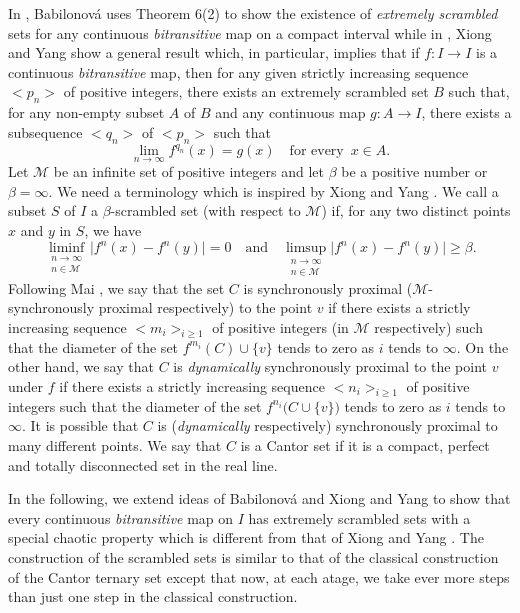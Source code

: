 \documentclass[12pt]{article}
\begin{document}
In {\bf\cite{bab}}, Babilonov\'a uses Theorem 6(2) to show the existence of {\it extremely scrambled} sets for any continuous {\it bitransitive} map on a compact interval while in {\bf\cite{xiong}}, Xiong and Yang show a general result which, in particular, implies that if $f : I \longrightarrow I$ is a continuous {\it bitransitive} map, then for any given strictly increasing sequence $< p_n >$ of positive integers, there exists an extremely scrambled set $B$ such that, for any non-empty subset $A$ of $B$ and any continuous map $g : A \longrightarrow I$, there exists a subsequence $< q_n >$ of $< p_n >$ such that 
$$
\lim_{n \to \infty} f^{q_n}(x) = g(x) \quad \text{for every} \,\,\, x \in A.
$$
\indent Let $\mathcal M$ be an infinite set of positive integers and let $\beta$ be a positive number or $\beta = \infty$.  We need a terminology which is inspired by Xiong and Yang {\bf\cite{xiong}}.  We call a subset $S$ of $I$ a $\beta$-scrambled set (with respect to $\mathcal M$) if, for any two distinct points $x$ and $y$ in $S$, we have
$$
\liminf_{\substack{{n \to \infty} \\ n \in \mathcal M}} \big|f^n(x) - f^n(y)\big| = 0 \quad \text{and} \quad \limsup_{\substack{{n \to \infty} \\ n \in \mathcal M}} \big|f^n(x) - f^n(y)\big| \ge \beta.
$$
\indent Following Mai {\bf\cite{mai}}, we say that the set $C$ is synchronously proximal ($\mathcal M$-synchronously proximal respectively) to the point $v$ if there exists a strictly increasing sequence $< m_i >_{i \ge 1}$ of positive integers (in $\mathcal M$ respectively) such that the diameter of the set $f^{m_i}(C) \cup \{ v \}$ tends to zero as $i$ tends to $\infty$.  On the other hand, we say that $C$ is {\it dynamically} synchronously proximal to the point $v$ under $f$ if there exists a strictly increasing sequence $< n_i >_{i \ge 1}$ of positive integers such that the diameter of the set $f^{n_i}\big(C \cup \{ v \}\big)$ tends to zero as $i$ tends to $\infty$.  It is possible that $C$ is ({\it dynamically} respectively) synchronously proximal to many different points.  We say that $C$ is a Cantor set if it is a compact, perfect and totally disconnected set in the real line.

In the following, we extend ideas of Babilonov\'a {\bf\cite{bab}} and Xiong and Yang {\bf\cite{xiong}} to show that every continuous {\it bitransitive} map on $I$ has extremely scrambled sets with a special chaotic property which is different from that of Xiong and Yang {\bf\cite{xiong}}.  The construction of the scrambled sets is similar to that of the classical construction of the Cantor ternary set except that now, at each atage, we take ever more steps than just one step in the classical construction.
\end{document}
